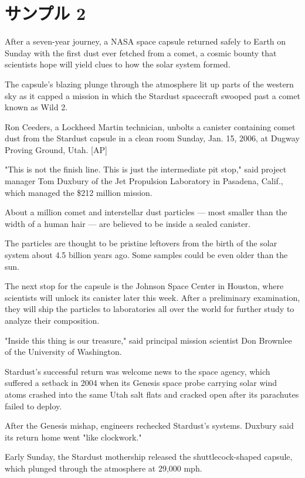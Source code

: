 \documentclass[a4j,9pt,twocolumn,dvipdfmx]{jsarticle}
\begin{document}
\section{サンプル 2}
After a seven-year journey, a NASA space capsule returned safely to
Earth on Sunday with the first dust ever fetched from a comet, a cosmic
bounty that scientists hope will yield clues to how the solar system
formed.

The capsule's blazing plunge through the atmosphere lit up parts of the
western sky as it capped a mission in which the Stardust spacecraft
swooped past a comet known as Wild 2.

Ron Ceeders, a Lockheed Martin technician, unbolts a canister containing
comet dust from the Stardust capsule in a clean room Sunday, Jan. 15,
2006, at Dugway Proving Ground, Utah. [AP]

"This is not the finish line. This is just the intermediate pit stop,"
said project manager Tom Duxbury of the Jet Propulsion Laboratory in
Pasadena, Calif., which managed the \$212 million mission.

About a million comet and interstellar dust particles --- most
smaller than the width of a human hair --- are believed to be inside
a sealed canister.

The particles are thought to be pristine leftovers from the birth of the
solar system about 4.5 billion years ago. Some samples could be even
older than the sun.

The next stop for the capsule is the Johnson Space Center in Houston,
where scientists will unlock its canister later this week. After a
preliminary examination, they will ship the particles to laboratories
all over the world for further study to analyze their composition.

"Inside this thing is our treasure," said principal mission scientist
Don Brownlee of the University of Washington.

Stardust's successful return was welcome news to the space agency, which
suffered a setback in 2004 when its Genesis space probe carrying solar
wind atoms crashed into the same Utah salt flats and cracked open after
its parachutes failed to deploy.

After the Genesis mishap, engineers rechecked Stardust's
systems. Duxbury said its return home went "like clockwork."

Early Sunday, the Stardust mothership released the shuttlecock-shaped
capsule, which plunged through the atmosphere at 29,000
mph.
\end{document}
